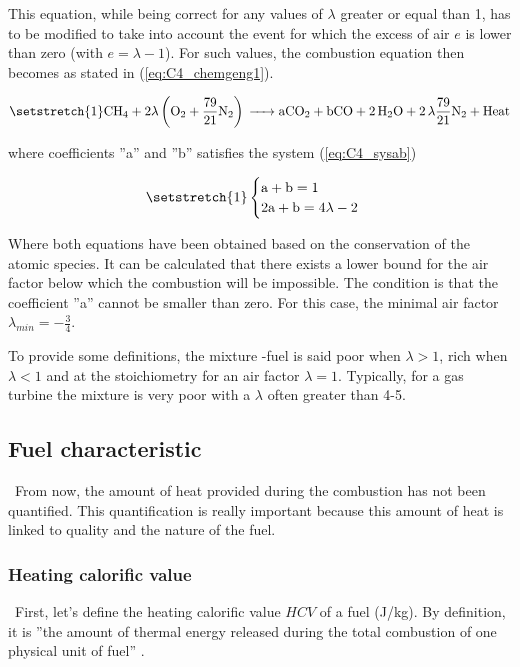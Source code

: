 This equation, while being correct for any values of \(\lambda\) greater or equal than 1, has to be modified to take into account the event for which the excess of air \(e\) is lower than zero (with \(e=\lambda -1\)). For such values, the combustion equation then becomes as stated in (\ref{eq:C4_chemgeng1}).

\begin{equation}
    \setstretch{1}
    \ce{CH4 +}2\lambda \left(\ce{O2}+\frac{79}{21}\ce{N2}\right) \ce{-> aCO2 + bCO + 2H2O + 2\lambda\frac{79}{21}N2 + \text{Heat}}\label{eq:C4_chemgeng1}
\end{equation}

where coefficients ''a'' and ''b'' satisfies the system (\ref{eq:C4_sysab})

\begin{equation}
    \setstretch{1}
    \begin{cases}
        \text{a} + \text{b} = 1 \\
        2\text{a} + \text{b} = 4\lambda - 2
    \end{cases}\label{eq:C4_sysab}
\end{equation}

Where both equations have been obtained based on the conservation of the atomic species. It can be calculated that there exists a lower bound for the air factor below which the combustion will be impossible. The condition is that the coefficient ''a'' cannot be smaller than zero. For this case, the minimal air factor \(\lambda_{min} =-\frac{3}{4}\).

To provide some definitions, the mixture -fuel is said poor when \(\lambda>1\), rich when \(\lambda<1\) and at the stoichiometry for an air factor \(\lambda=1\). Typically, for a gas turbine the mixture is very poor with a $\lambda$ often greater than 4-5.

\subsection{Fuel characteristic}
\quad\ From now, the amount of heat provided during the combustion has not been quantified. This quantification is really important because this amount of heat is linked to quality and the nature of the fuel.

\subsubsection{Heating calorific value}
\quad\ First, let's define the heating calorific value \(HCV\) of a fuel (J/kg). By definition, it is ''the amount of thermal energy released during the total combustion of one physical unit of fuel” \cite{Leonard2018}.

